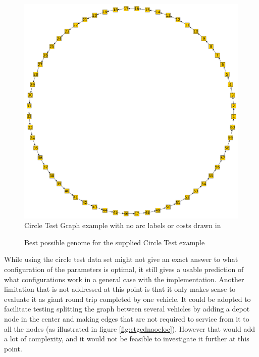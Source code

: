 \begin{figure}[H]
	\centerline{\includegraphics[width=\textwidth]{figures/CircleTests/CircleTestIllustrations/Circle_Test_Graph-No_arc_labels_or_costs.pdf}}
	\caption{Circle Test Graph example with no arc labels or costs drawn in}
	\label{fig:ctgnaloc}
\end{figure}

\begin{figure}[H]
	\noindent
	\caption{Best possible genome for the supplied Circle Test example}
	\label{fig:bpgftscte}
\end{figure}

While using the circle test data set might not give an exact answer to what configuration of the parameters is optimal, it still gives a usable prediction of what configurations work in a general case with the implementation. Another limitation that is not addressed at this point is that it only makes sense to evaluate it as giant round trip completed by one vehicle. It could be adopted to facilitate testing splitting the graph between several vehicles by adding a depot node in the center and making edges that are not required to service from it to all the nodes (as illustrated in figure \ref{fig:ctgcdnaoeloc}). However that would add a lot of complexity, and it would not be feasible to investigate it further at this point.

